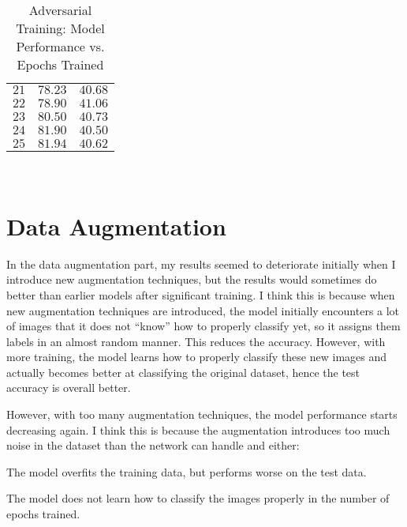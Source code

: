 \documentclass[11pt, reqno]{amsart}
\begin{document}
\begin{table}[h!]
\begin{tabular}{| r | r | r |}
      $21$                        & $78.23$                 & $40.68$ \\
      $22$                        & $78.90$                 & $41.06$ \\
      $23$                        & $80.50$                 & $40.73$ \\
      $24$                        & $81.90$                 & $40.50$ \\
      $25$                        & $81.94$                 & $40.62$ \\
    \toprule
  \end{tabular}
  \caption{Adversarial Training: Model Performance vs. Epochs Trained}~\label{tab:results}
\end{table}


\pagebreak
\section{Data Augmentation}

In the data augmentation part, my results seemed to deteriorate initially when I introduce new
augmentation techniques, but the results would sometimes do better than earlier models
after significant training.
I think this is because when new augmentation techniques are introduced, the model
initially encounters a lot of images that it does not ``know'' how to properly classify yet,
so it assigns them labels in an almost random manner. This reduces the accuracy.
However, with more training, the model learns how to properly classify these new images
and actually becomes better at classifying the original dataset,
hence the test accuracy is overall better.

However, with too many augmentation techniques, the model performance starts decreasing again.
I think this is because the augmentation introduces too much noise in the dataset
than the network can handle and either:
\begin{enumarabic}
  \item The model overfits the training data, but performs worse on the test data.
  \item The model does not learn how to classify the images properly in the number of epochs trained.
\end{enumarabic}
\end{document}
